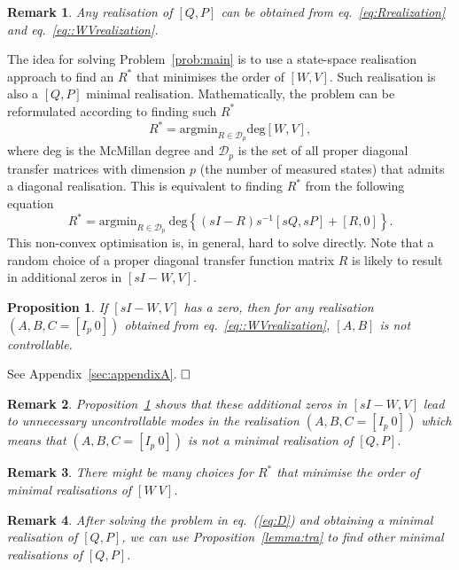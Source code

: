 \documentclass[twocolumn,12pt]{autart}
\theoremstyle{plain}
\newtheorem{proposition}{Proposition}
\newtheorem{remark}{Remark}
\newenvironment{proof}[1][Proof]{\begin{trivlist} \item[\hskip \labelsep {\bfseries #1}]}{\end{trivlist}}
\begin{document}
\begin{remark}
Any realisation of $[Q,P]$ can be obtained from eq.~\eqref{eq:Rrealization} and eq.~\eqref{eq::WVrealization}.
\end{remark}

The idea for solving Problem~\ref{prob:main} is to use a state-space realisation approach to find an ${R}^*$ that  minimises the order of $[{W},{V}]$. Such realisation is also a $[{Q},{P}]$ minimal realisation. Mathematically, the problem can be reformulated according to finding such ${R}^*$ 
$$R^*=\text{argmin}_{R\in\mathcal{D}_p} \text{deg} [W,V],$$
where deg is the McMillan degree \cite{zdg} and $\mathcal{D}_p$ is the set of all proper diagonal transfer matrices with dimension $p$ (the number of measured states) that admits a diagonal realisation. This is equivalent to finding $R^*$ from the following equation
\begin{equation}\label{eq:D}
R^*=\text{argmin}_{R\in\mathcal{D}_p} ~\text{deg}\left\{(s{I}-{R})s^{-1}[s{Q},s{P}]+[{R},{0}]\right\}.
\end{equation}
This non-convex optimisation is, in general, hard to solve directly. 
Note that a random choice of a proper diagonal transfer function matrix ${R}$ is likely to result in additional zeros in $[sI-W,V]$.
\begin{proposition}\label{prop:control}
If $[sI-W,V]$ has a zero, then for any realisation $(A,B,C=[I_p~0])$ obtained from eq.~\eqref{eq::WVrealization}, $[A,B]$ is not controllable.
\end{proposition}
\begin{proof}
See Appendix~\ref{sec:appendixA}. $\hfill \square$ 
\end{proof}
\begin{remark}
Proposition~\ref{prop:control} shows that these additional zeros in $[sI-W,V]$ lead to unnecessary uncontrollable modes in the realisation $(A,B,C=[I_p~0])$ which means that 
$(A,B,C=[I_p~0])$ is not a minimal realisation of $[Q,P]$.
\end{remark}

\begin{remark}
There might be many choices for ${R}^*$ that minimise
the order of minimal realisations of $[{W}~{V}]$.
\end{remark}

\begin{remark}
After solving the problem in eq.~(\ref{eq:D}) and obtaining a minimal realisation of $[Q,P]$, we can use Proposition~\ref{lemma:tra} to find other minimal realisations of $[Q,P]$. 
\end{remark}
 
\end{document}
